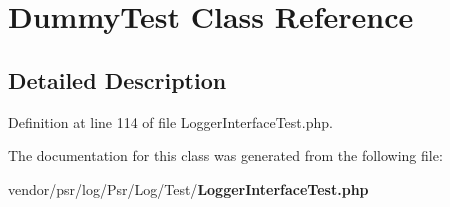\section{Dummy\+Test Class Reference}
\label{class_psr_1_1_log_1_1_test_1_1_dummy_test}


\subsection{Detailed Description}


Definition at line 114 of file Logger\+Interface\+Test.\+php.



The documentation for this class was generated from the following file\+:\begin{DoxyCompactItemize}
\item 
vendor/psr/log/\+Psr/\+Log/\+Test/{\bf Logger\+Interface\+Test.\+php}\end{DoxyCompactItemize}
